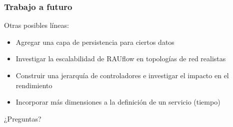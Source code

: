 \documentclass{beamer}
\begin{document}
\begin{frame}
\frametitle{Trabajo a futuro} 

Otras posibles l\'ineas:
\pause
\begin{itemize}[<+->]

\item Agregar una capa de persistencia para ciertos datos

\item Investigar la escalabilidad de RAUflow en topolog\'ias de red realistas 

\item Construir una jerarqu\'ia de controladores e investigar el impacto en el rendimiento 

\item Incorporar m\'as dimensiones a la definici\'on de un servicio (tiempo)

\end{itemize}

\end{frame}

\begin{frame}
\centering
\Huge
¿Preguntas?

\end{frame}


\end{document}
